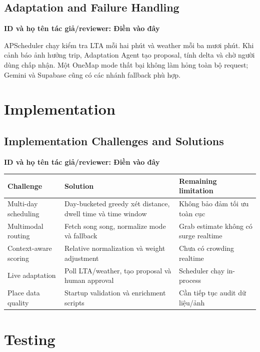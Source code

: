 \documentclass[12pt,a4paper,oneside]{report}
\newcommand{\tacgia}{%
  \begin{tcolorbox}[colback=blue!3,colframe=blue!25,boxrule=0.4pt,arc=1mm]
    \small\textbf{ID và họ tên tác giả/reviewer: Điền vào đây}
  \end{tcolorbox}
}
\begin{document}
\section{Adaptation and Failure Handling}
\tacgia
APScheduler chạy kiểm tra LTA mỗi hai phút và weather mỗi ba mươi phút. Khi cảnh báo ảnh hưởng trip, Adaptation Agent tạo proposal, tính delta và chờ người dùng chấp nhận. Một OneMap mode thất bại không làm hỏng toàn bộ request; Gemini và Supabase cũng có các nhánh fallback phù hợp.

\chapter{Implementation}
\section{Implementation Challenges and Solutions}
\tacgia
\begin{longtable}{p{3.5cm}p{5.5cm}p{6cm}}
\toprule
\textbf{Challenge} & \textbf{Solution} & \textbf{Remaining limitation} \\
\midrule
Multi-day scheduling & Day-bucketed greedy xét distance, dwell time và time window & Không bảo đảm tối ưu toàn cục \\
Multimodal routing & Fetch song song, normalize mode và fallback & Grab estimate không có surge realtime \\
Context-aware scoring & Relative normalization và weight adjustment & Chưa có crowding realtime \\
Live adaptation & Poll LTA/weather, tạo proposal và human approval & Scheduler chạy in-process \\
Place data quality & Startup validation và enrichment scripts & Cần tiếp tục audit dữ liệu/ảnh \\
\bottomrule
\end{longtable}

\chapter{Testing}
\end{document}
